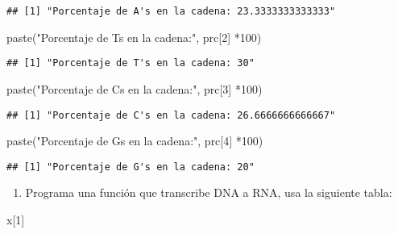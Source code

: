 \documentclass[
]{article}
\newenvironment{Shaded}{\begin{snugshade}}{\end{snugshade}}
\newcommand{\DecValTok}[1]{\textcolor[rgb]{0.00,0.00,0.81}{#1}}
\newcommand{\FunctionTok}[1]{\textcolor[rgb]{0.00,0.00,0.00}{#1}}
\newcommand{\NormalTok}[1]{#1}
\newcommand{\SpecialCharTok}[1]{\textcolor[rgb]{0.00,0.00,0.00}{#1}}
\newcommand{\StringTok}[1]{\textcolor[rgb]{0.31,0.60,0.02}{#1}}
\providecommand{\tightlist}{%
  \setlength{\itemsep}{0pt}\setlength{\parskip}{0pt}}
\begin{document}
\begin{verbatim}
## [1] "Porcentaje de A's en la cadena: 23.3333333333333"
\end{verbatim}

\begin{Shaded}
\begin{Highlighting}[]
\FunctionTok{paste}\NormalTok{(}\StringTok{"Porcentaje de T\textquotesingle{}s en la cadena:"}\NormalTok{, prc[}\DecValTok{2}\NormalTok{] }\SpecialCharTok{*}\DecValTok{100}\NormalTok{)}
\end{Highlighting}
\end{Shaded}

\begin{verbatim}
## [1] "Porcentaje de T's en la cadena: 30"
\end{verbatim}

\begin{Shaded}
\begin{Highlighting}[]
\FunctionTok{paste}\NormalTok{(}\StringTok{"Porcentaje de C\textquotesingle{}s en la cadena:"}\NormalTok{, prc[}\DecValTok{3}\NormalTok{] }\SpecialCharTok{*}\DecValTok{100}\NormalTok{)}
\end{Highlighting}
\end{Shaded}

\begin{verbatim}
## [1] "Porcentaje de C's en la cadena: 26.6666666666667"
\end{verbatim}

\begin{Shaded}
\begin{Highlighting}[]
\FunctionTok{paste}\NormalTok{(}\StringTok{"Porcentaje de G\textquotesingle{}s en la cadena:"}\NormalTok{, prc[}\DecValTok{4}\NormalTok{] }\SpecialCharTok{*}\DecValTok{100}\NormalTok{)}
\end{Highlighting}
\end{Shaded}

\begin{verbatim}
## [1] "Porcentaje de G's en la cadena: 20"
\end{verbatim}

\begin{enumerate}
\def\labelenumi{\arabic{enumi}.}
\setcounter{enumi}{3}
\tightlist
\item
  Programa una función que transcribe DNA a RNA, usa la siguiente tabla:
\end{enumerate}

\begin{Shaded}
\begin{Highlighting}[]
\NormalTok{x[}\DecValTok{1}\NormalTok{]}
\end{Highlighting}
\end{Shaded}
\end{document}
